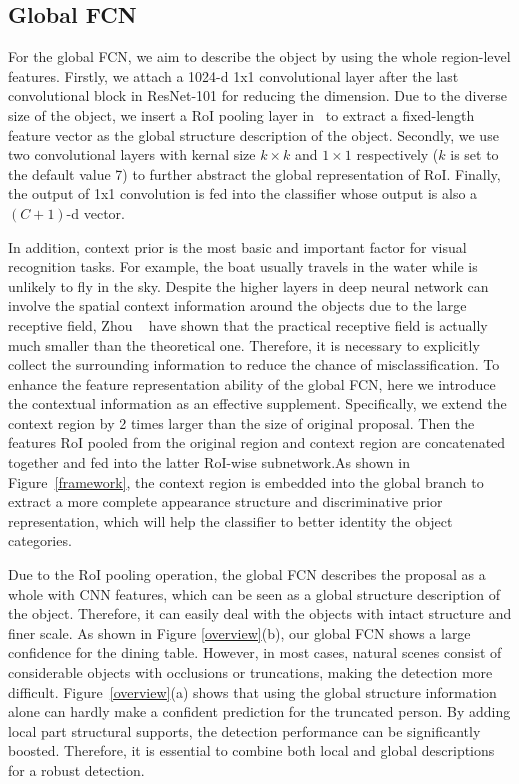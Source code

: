 \documentclass[10pt,twocolumn,letterpaper]{article}
\begin{document}
\subsection{Global FCN}
For the global FCN, we aim to describe the object by using the whole region-level features. Firstly, we attach a 1024-d 1x1 convolutional layer after the last convolutional block in ResNet-101 for reducing the dimension. Due to the diverse size of the object, we insert a RoI pooling layer in~\cite{girshick2015fast} to extract a fixed-length feature vector as the global structure description of the object. Secondly, we use two convolutional layers with kernal size $k\times k$ and $1\times 1$ respectively ($k$ is set to the default value 7) to further abstract the global representation of RoI. Finally, the output of 1x1 convolution is fed into the classifier whose output is also a $(C+1)$-d vector.

In addition, context prior is the most basic and important factor for visual recognition tasks. For example, the boat usually travels in the water while is unlikely to fly in the sky. Despite the higher layers in deep neural network can involve the spatial context information around the objects due to the large receptive field, Zhou \etal~\cite{zhou2014object} have shown that the practical receptive field is actually much smaller than the theoretical one. Therefore, it is necessary to explicitly collect the surrounding information to reduce the chance of misclassification. To enhance the feature representation ability of the global FCN, here we introduce the contextual information as an effective supplement. Specifically, we extend the context region by 2 times larger than the size of original proposal. Then the features RoI pooled from the original region and context region are concatenated together and fed into the latter RoI-wise subnetwork.As shown in Figure~\ref{framework}, the context region is embedded into the global branch to extract a more complete appearance structure and discriminative prior representation, which will help the classifier to better identity the object categories.

Due to the RoI pooling operation, the global FCN describes the proposal as a whole with CNN features, which can be seen as a global structure description of the object. Therefore, it can easily deal with the objects with intact structure and finer scale. As shown in Figure \ref{overview}(b), our global FCN shows a large confidence for the dining table. However, in most cases, natural scenes consist of considerable objects with occlusions or truncations, making the detection more difficult. Figure~\ref{overview}(a) shows that using the global structure information alone can hardly make a confident prediction for the truncated person. By adding local part structural supports, the detection performance can be significantly boosted. Therefore, it is essential to combine both local and global descriptions for a robust detection.
\end{document}
